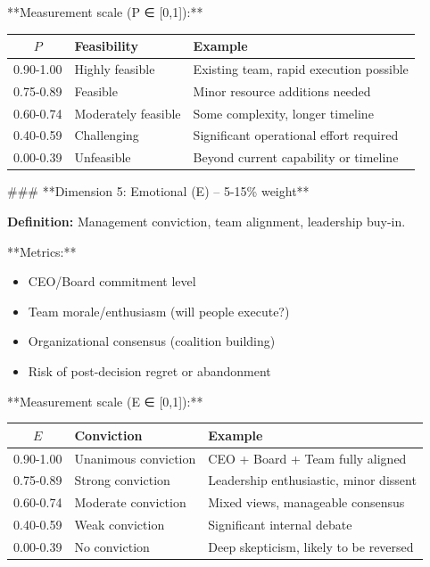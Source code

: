 \documentclass[11pt]{article}
\begin{document}
**Measurement scale (P ∈ [0,1]):**
\begin{table}[h]
\centering
\begin{tabular}{|c|l|l|}
\hline
$P$ & \textbf{Feasibility} & \textbf{Example} \\
\hline
0.90-1.00 & Highly feasible & Existing team, rapid execution possible \\
0.75-0.89 & Feasible & Minor resource additions needed \\
0.60-0.74 & Moderately feasible & Some complexity, longer timeline \\
0.40-0.59 & Challenging & Significant operational effort required \\
0.00-0.39 & Unfeasible & Beyond current capability or timeline \\
\hline
\end{tabular}
\end{table}

### **Dimension 5: Emotional (E) – 5-15\% weight**

\textbf{Definition:} Management conviction, team alignment, leadership buy-in.

**Metrics:**
\begin{itemize}
\item CEO/Board commitment level
\item Team morale/enthusiasm (will people execute?)
\item Organizational consensus (coalition building)
\item Risk of post-decision regret or abandonment
\end{itemize}

**Measurement scale (E ∈ [0,1]):**
\begin{table}[h]
\centering
\begin{tabular}{|c|l|l|}
\hline
$E$ & \textbf{Conviction} & \textbf{Example} \\
\hline
0.90-1.00 & Unanimous conviction & CEO + Board + Team fully aligned \\
0.75-0.89 & Strong conviction & Leadership enthusiastic, minor dissent \\
0.60-0.74 & Moderate conviction & Mixed views, manageable consensus \\
0.40-0.59 & Weak conviction & Significant internal debate \\
0.00-0.39 & No conviction & Deep skepticism, likely to be reversed \\
\hline
\end{tabular}
\end{table}
\end{document}
